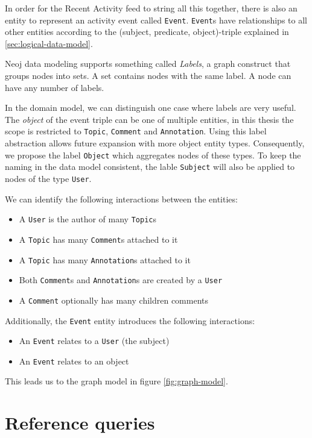 In order for the Recent Activity feed to string all this together, there is also an entity to represent an activity event called \texttt{Event}.
\texttt{Event}s have relationships to all other entities according to the (subject, predicate, object)-triple explained in \cref{sec:logical-data-model}.

Neoj data modeling supports something called \textit{Labels}, a graph construct that groups nodes into sets.
A set contains nodes with the same label.
A node can have any number of labels.

In the domain model, we can distinguish one case where labels are very useful.
The \textit{object} of the event triple can be one of multiple entities, in this thesis the scope is restricted to \texttt{Topic}, \texttt{Comment} and \texttt{Annotation}.
Using this label abstraction allows future expansion with more object entity types.
Consequently, we propose the label \texttt{Object} which aggregates nodes of these types.
To keep the naming in the data model consistent, the lable \texttt{Subject} will also be applied to nodes of the type \texttt{User}.

We can identify the following interactions between the entities:

\begin{itemize}
  \item A \texttt{User} is the author of many \texttt{Topic}s
  \item A \texttt{Topic} has many \texttt{Comment}s attached to it
  \item A \texttt{Topic} has many \texttt{Annotation}s attached to it
  \item Both \texttt{Comment}s and \texttt{Annotation}s are created by a \texttt{User}
  \item A \texttt{Comment} optionally has many children comments
\end{itemize}

Additionally, the \texttt{Event} entity introduces the following interactions:

\begin{itemize}
  \item An \texttt{Event} relates to a \texttt{User} (the subject)
  \item An \texttt{Event} relates to an object
\end{itemize}

This leads us to the graph model in figure \ref{fig:graph-model}.

\section{Reference queries}
\label{sec:reference-queries}

